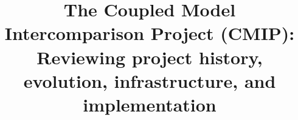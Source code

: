 \documentclass[manuscript]{copernicus}
\newcommand{\mycomment}[1]{}
\begin{document}
\title{The Coupled Model Intercomparison Project (CMIP): Reviewing project history, evolution, infrastructure, and implementation}
\mycomment{
Veronika E alternate: The Coupled Model Intercomparison Project (CMIP): Reviewing project history, evolution, and infrastructure; it would be nice if the title could somehow include the word ``infrastructure'', as it is a big part of the paper. Maybe replace future with infrastructure? Karl: I like that idea
was: The Coupled Model Intercomparison Project phase 6 (CMIP6): A review of project evolution and future
Pete G alternate: The Coupled Model Intercomparison Project phase 6 (CMIP6) was made possible by an evolution of project implementation
Jiwoo alternate: The Coupled Model Intercomparison Project (CMIP): a review of project history, evolution and future
}

\end{document}
